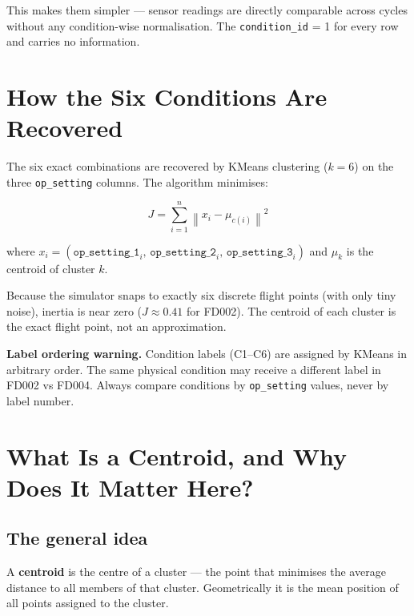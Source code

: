 \documentclass[11pt, a4paper]{article}
\begin{document}
This makes them simpler --- sensor readings are directly
comparable across cycles without any condition-wise
normalisation. The \texttt{condition\_id} = 1 for every row
and carries no information.

\section{How the Six Conditions Are Recovered}
\label{sec:kmeans}

The six exact combinations are recovered by KMeans clustering
($k = 6$) on the three \texttt{op\_setting} columns.
The algorithm minimises:

\begin{equation}
  J = \sum_{i=1}^{n} \left\| x_i - \mu_{c(i)} \right\|^2
\end{equation}

where $x_i = (\texttt{op\_setting\_1}_i,\,
\texttt{op\_setting\_2}_i,\, \texttt{op\_setting\_3}_i)$
and $\mu_k$ is the centroid of cluster $k$.

Because the simulator snaps to exactly six discrete flight
points (with only tiny noise), inertia is near zero
($J \approx 0.41$ for FD002). The centroid of each cluster
is the exact flight point, not an approximation.

\begin{keybox}
\textbf{Label ordering warning.} Condition labels (C1--C6)
are assigned by KMeans in arbitrary order. The same physical
condition may receive a different label in FD002 vs FD004.
Always compare conditions by \texttt{op\_setting} values,
never by label number.
\end{keybox}


\section{What Is a Centroid, and Why Does It Matter Here?}

\subsection{The general idea}

A \textbf{centroid} is the centre of a cluster --- the point
that minimises the average distance to all members of that cluster.
Geometrically it is the mean position of all points assigned
to the cluster.
\end{document}
